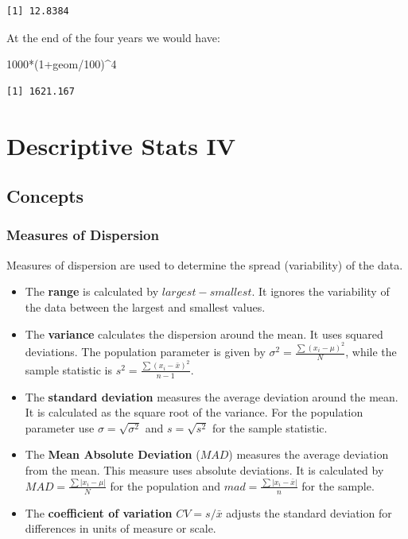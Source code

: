 \documentclass[
  letterpaper,
  DIV=11,
  numbers=noendperiod]{scrreprt}
\newenvironment{Shaded}{\begin{snugshade}}{\end{snugshade}}
\newcommand{\DecValTok}[1]{\textcolor[rgb]{0.68,0.00,0.00}{#1}}
\newcommand{\NormalTok}[1]{\textcolor[rgb]{0.00,0.23,0.31}{#1}}
\newcommand{\SpecialCharTok}[1]{\textcolor[rgb]{0.37,0.37,0.37}{#1}}
\begin{document}
\begin{verbatim}
[1] 12.8384
\end{verbatim}

At the end of the four years we would have:

\begin{Shaded}
\begin{Highlighting}[numbers=left,,]
\DecValTok{1000}\SpecialCharTok{*}\NormalTok{(}\DecValTok{1}\SpecialCharTok{+}\NormalTok{geom}\SpecialCharTok{/}\DecValTok{100}\NormalTok{)}\SpecialCharTok{\^{}}\DecValTok{4}
\end{Highlighting}
\end{Shaded}

\begin{verbatim}
[1] 1621.167
\end{verbatim}

\hypertarget{descriptive-stats-iv}{%
\chapter{Descriptive Stats IV}\label{descriptive-stats-iv}}

\hypertarget{concepts-3}{%
\section{Concepts}\label{concepts-3}}

\hypertarget{measures-of-dispersion}{%
\subsection*{Measures of Dispersion}\label{measures-of-dispersion}}

Measures of dispersion are used to determine the spread (variability) of
the data.

\begin{itemize}
\item
  The \textbf{range} is calculated by \(largest-smallest\). It ignores
  the variability of the data between the largest and smallest values.
\item
  The \textbf{variance} calculates the dispersion around the mean. It
  uses squared deviations. The population parameter is given by
  \(\sigma^2= \frac{\sum (x_i-\mu)^2}{N}\), while the sample statistic
  is \(s^2=\frac{\sum (x_i-\bar{x})^2}{n-1}\).
\item
  The \textbf{standard deviation} measures the average deviation around
  the mean. It is calculated as the square root of the variance. For the
  population parameter use \(\sigma=\sqrt{\sigma^2}\) and
  \(s=\sqrt{s^2}\) for the sample statistic.
\item
  The \textbf{Mean Absolute Deviation} (\(MAD\)) measures the average
  deviation from the mean. This measure uses absolute deviations. It is
  calculated by \(MAD=\frac{\sum |x_i-\mu|}{N}\) for the population and
  \(mad=\frac{\sum |x_i-\bar{x}|}{n}\) for the sample.
\item
  The \textbf{coefficient of variation} \(CV=s/\bar{x}\) adjusts the
  standard deviation for differences in units of measure or scale.
\end{itemize}
\end{document}
